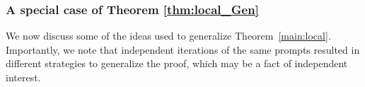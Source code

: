 \documentclass[11pt]{amsart}
\theoremstyle{remark}
\begin{document}
\subsubsection{A special case of Theorem \ref{thm:local_Gen}} We now discuss some of the ideas used to generalize  Theorem~\ref{main:local}. Importantly, we note that independent iterations of the same prompts resulted in different strategies to generalize the proof, which may be  a fact of independent interest.
\vspace{0.5em}
\end{document}
